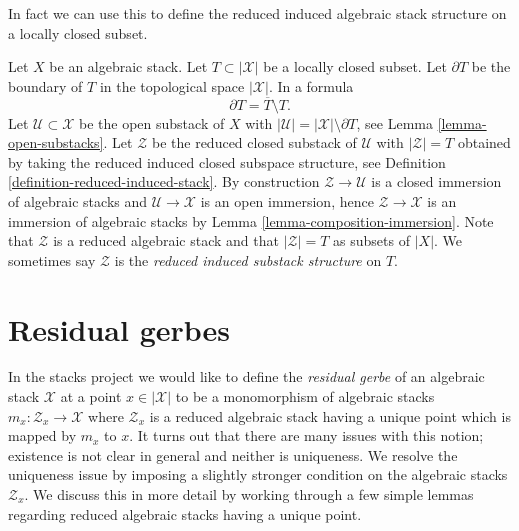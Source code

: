 \noindent
In fact we can use this to define the reduced induced algebraic
stack structure on a locally closed subset.

\begin{remark}
\label{remark-stack-structure-locally-closed-subset}
Let $X$ be an algebraic stack.
Let $T \subset |\mathcal{X}|$ be a locally closed subset.
Let $\partial T$ be the boundary of $T$ in
the topological space $|\mathcal{X}|$. In a formula
$$
\partial T = \overline{T} \setminus T.
$$
Let $\mathcal{U} \subset \mathcal{X}$ be the open substack of $X$ with
$|\mathcal{U}| = |\mathcal{X}| \setminus \partial T$, see
Lemma \ref{lemma-open-substacks}.
Let $\mathcal{Z}$ be the reduced closed substack of $\mathcal{U}$ with
$|\mathcal{Z}| = T$ obtained by taking the reduced induced
closed subspace structure, see
Definition \ref{definition-reduced-induced-stack}.
By construction $\mathcal{Z} \to \mathcal{U}$ is a closed immersion of
algebraic stacks and $\mathcal{U} \to \mathcal{X}$ is an open immersion,
hence $\mathcal{Z} \to \mathcal{X}$ is an immersion of algebraic stacks by
Lemma \ref{lemma-composition-immersion}.
Note that $\mathcal{Z}$ is a reduced algebraic stack and that
$|\mathcal{Z}| = T$ as subsets of $|X|$. We sometimes say
$\mathcal{Z}$ is the {\it reduced induced substack structure} on $T$.
\end{remark}













\section{Residual gerbes}
\label{section-residual-gerbe}

\noindent
In the stacks project we would like to define the {\it residual gerbe}
of an algebraic stack $\mathcal{X}$ at a point $x \in |\mathcal{X}|$
to be a monomorphism of algebraic stacks
$m_x : \mathcal{Z}_x \to \mathcal{X}$ where $\mathcal{Z}_x$ is a reduced
algebraic stack having a unique point which is mapped by $m_x$ to $x$.
It turns out that there are many issues with this notion; existence is not
clear in general and neither is uniqueness.
We resolve the uniqueness issue by imposing a slightly stronger
condition on the algebraic stacks $\mathcal{Z}_x$.
We discuss this in more detail by working through a few simple lemmas
regarding reduced algebraic stacks having a unique point.

